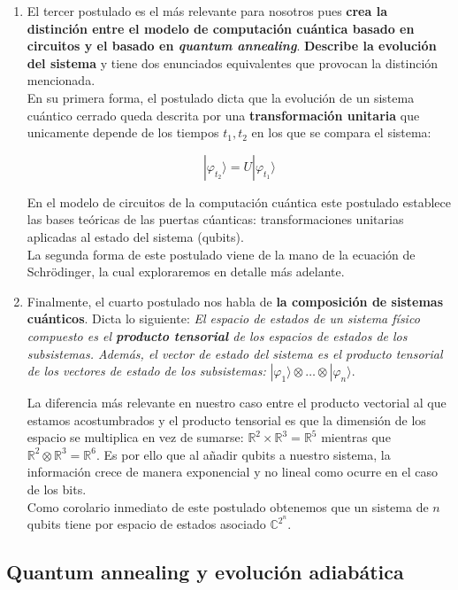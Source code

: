 \documentclass[11pt]{article}
\newcommand*{\C}{\mathbb{C}}
\newcommand*{\R}{\mathbb{R}}
\newcommand*{\ra}{\rangle}
\begin{document}
\begin{enumerate}
	\item El tercer postulado es el más relevante para nosotros pues \textbf{crea la distinción entre el modelo de computación cuántica basado en circuitos y el basado en \emph{quantum annealing}}. \textbf{Describe la evolución del sistema} y tiene dos enunciados equivalentes que provocan la distinción mencionada. \\
	
	En su primera forma, el postulado dicta que la evolución de un sistema cuántico cerrado queda descrita por una \textbf{transformación unitaria} que unicamente depende de los tiempos $t_1,t_2$ en los que se compara el sistema:
	
	\[ |\varphi_{t_2}\ra = U|\varphi_{t_1}\ra \]
	
	En el modelo de circuitos de la computación cuántica este postulado establece las bases teóricas de las puertas cúanticas: transformaciones unitarias aplicadas al estado del sistema (qubits). \\
	
	La segunda forma de este postulado viene de la mano de la ecuación de Schrödinger, la cual exploraremos en detalle más adelante.
	
	\item Finalmente, el cuarto postulado nos habla de \textbf{la composición de sistemas cuánticos}. Dicta lo siguiente: \emph{El espacio de estados de un sistema físico compuesto es el \textbf{producto tensorial} de los espacios de estados de los subsistemas. Además, el vector de estado del sistema es el producto tensorial de los vectores de estado de los subsistemas:} $|\varphi_1\ra \otimes \dotsc \otimes |\varphi_n\ra$.
	
	La diferencia más relevante en nuestro caso entre el producto vectorial al que estamos acostumbrados y el producto tensorial es que la dimensión de los espacio se multiplica en vez de sumarse: $\R^2 \times \R^3 = \R^5$ mientras que $\R^2 \otimes \R^3 = \R^6$. Es por ello que al añadir qubits a nuestro sistema, la información crece de manera exponencial y no lineal como ocurre en el caso de los bits. \\
	
	Como corolario inmediato de este postulado obtenemos que un sistema de $n$ qubits tiene por espacio de estados asociado $\C^{2^n}$. 
\end{enumerate}

\subsection{Quantum annealing y evolución adiabática}
\end{document}
